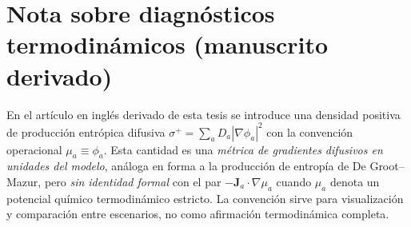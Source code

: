 \section{Nota sobre diagnósticos termodinámicos (manuscrito derivado)}
En el artículo en inglés derivado de esta tesis se introduce una densidad positiva de producción entrópica difusiva $\sigma^+=\sum_a D_a|\nabla\phi_a|^2$ con la convención operacional $\mu_a\equiv\phi_a$. Esta cantidad es una \emph{métrica de gradientes difusivos en unidades del modelo}, análoga en forma a la producción de entropía de De Groot--Mazur, pero \emph{sin identidad formal} con el par $-\mathbf{J}_a\cdot\nabla\mu_a$ cuando $\mu_a$ denota un potencial químico termodinámico estricto. La convención sirve para visualización y comparación entre escenarios, no como afirmación termodinámica completa.



















